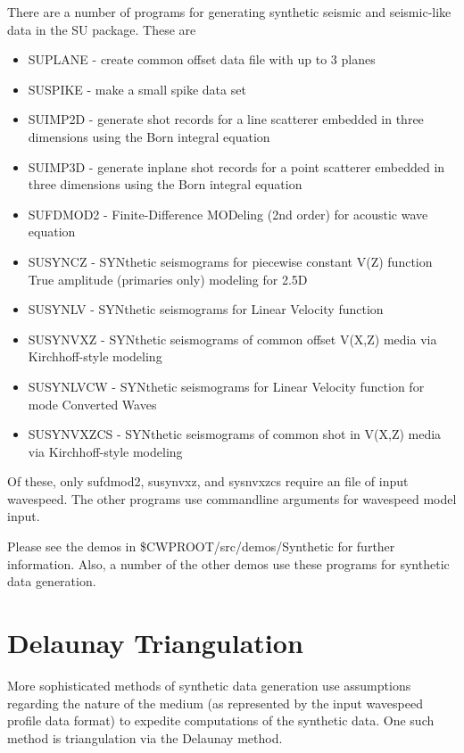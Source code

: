 {{{{{{{There are a number of programs for generating synthetic seismic 
and seismic-like data in the SU package.
These are
\begin{itemize}
\item SUPLANE - create common offset data file with up to 3 planes 
\item SUSPIKE - make a small spike data set
\item SUIMP2D - generate shot records for a line scatterer embedded 
in three dimensions using the Born integral equation 
\item SUIMP3D - generate inplane shot records for a point scatterer
embedded in three dimensions using the Born integral equation
\item SUFDMOD2 - Finite-Difference MODeling (2nd order) for acoustic 
wave equation
\item SUSYNCZ - SYNthetic seismograms for piecewise constant V(Z) function   
True amplitude (primaries only) modeling for 2.5D
\item SUSYNLV - SYNthetic seismograms for Linear Velocity function
\item SUSYNVXZ - SYNthetic seismograms of common offset V(X,Z) media via     
Kirchhoff-style modeling
\item SUSYNLVCW - SYNthetic seismograms for Linear Velocity function
for mode Converted Waves
\item SUSYNVXZCS - SYNthetic seismograms of common shot in V(X,Z) media via  
Kirchhoff-style modeling
\end{itemize}
Of these, only sufdmod2, susynvxz, and sysnvxzcs require an file
of input wavespeed. The other programs use commandline arguments
for wavespeed model input.

Please see the demos in \$CWPROOT/src/demos/Synthetic for further
information. Also, a number of the other demos use these programs
for synthetic data generation.

\section{Delaunay Triangulation}

More sophisticated methods of synthetic data generation use
assumptions regarding the nature of the medium (as represented
by the input wavespeed profile data format) to expedite computations
of the synthetic data. One such method is triangulation via the
Delaunay method. 

}}}}}}}
